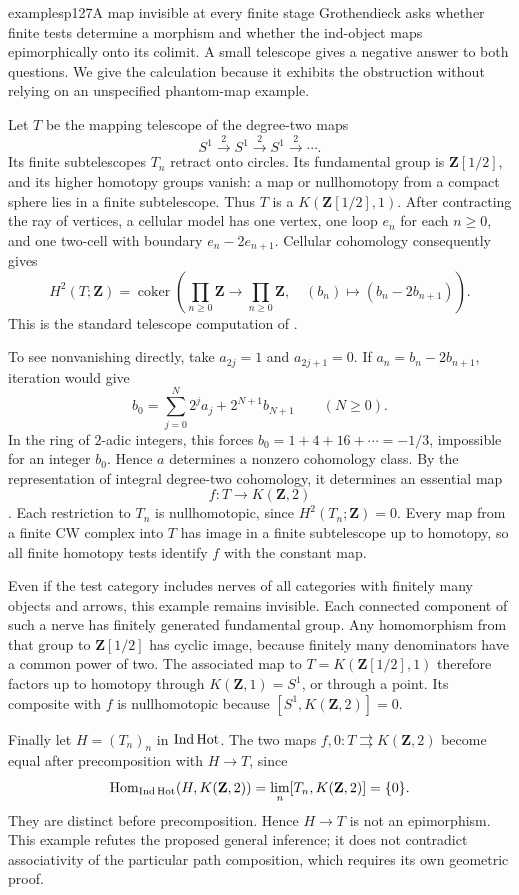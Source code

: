\begin{dcomment}{examples}{p127}{A map invisible at every finite stage}
Grothendieck asks whether finite tests determine a morphism and whether the ind-object maps epimorphically onto its colimit. A small telescope gives a negative answer to both questions. We give the calculation because it exhibits the obstruction without relying on an unspecified phantom-map example.

Let $T$ be the mapping telescope of the degree-two maps
\[
 S^1\xrightarrow{2}S^1\xrightarrow{2}S^1\xrightarrow{2}\cdots.
\]
Its finite subtelescopes $T_n$ retract onto circles. Its fundamental group is $\mathbf Z[1/2]$, and its higher homotopy groups vanish: a map or nullhomotopy from a compact sphere lies in a finite subtelescope. Thus $T$ is a $K(\mathbf Z[1/2],1)$. After contracting the ray of vertices, a cellular model has one vertex, one loop $e_n$ for each $n\geq0$, and one two-cell with boundary $e_n-2e_{n+1}$. Cellular cohomology consequently gives
\[
 H^2(T;\mathbf Z)=\operatorname{coker}\left(
 \prod_{n\geq0}\mathbf Z\longrightarrow\prod_{n\geq0}\mathbf Z,
 \quad(b_n)\longmapsto(b_n-2b_{n+1})\right).
\]
This is the standard telescope computation of \citet[Examples~3F.7 and~3F.9]{Hatcher2002}.

To see nonvanishing directly, take $a_{2j}=1$ and $a_{2j+1}=0$. If $a_n=b_n-2b_{n+1}$, iteration would give
\[
 b_0=\sum_{j=0}^{N}2^ja_j+2^{N+1}b_{N+1}
 \qquad(N\geq0).
\]
In the ring of $2$-adic integers, this forces
$b_0=1+4+16+\cdots=-1/3$, impossible for an integer $b_0$. Hence $a$ determines a nonzero cohomology class. By the representation of integral degree-two cohomology, it determines an essential map
\[
 f:T\longrightarrow K(\mathbf Z,2)
\]
\citep[Theorem~4.57]{Hatcher2002}. Each restriction to $T_n$ is nullhomotopic, since $H^2(T_n;\mathbf Z)=0$. Every map from a finite CW complex into $T$ has image in a finite subtelescope up to homotopy, so all finite homotopy tests identify $f$ with the constant map.

Even if the test category includes nerves of all categories with finitely many objects and arrows, this example remains invisible. Each connected component of such a nerve has finitely generated fundamental group. Any homomorphism from that group to $\mathbf Z[1/2]$ has cyclic image, because finitely many denominators have a common power of two. The associated map to $T=K(\mathbf Z[1/2],1)$ therefore factors up to homotopy through $K(\mathbf Z,1)=S^1$, or through a point. Its composite with $f$ is nullhomotopic because $[S^1,K(\mathbf Z,2)]=0$.

Finally let $H=(T_n)_n$ in $\mathrm{Ind}\,\mathrm{Hot}$. The two maps $f,0:T\rightrightarrows K(\mathbf Z,2)$ become equal after precomposition with $H\to T$, since
\[
 \mathrm{Hom}_{\mathrm{Ind}\,\mathrm{Hot}}(H,K(\mathbf Z,2))
      =\mathop{\rm lim}_n[T_n,K(\mathbf Z,2)]=\{0\}.
\]
They are distinct before precomposition. Hence $H\to T$ is not an epimorphism. This example refutes the proposed general inference; it does not contradict associativity of the particular path composition, which requires its own geometric proof.
\end{dcomment}


